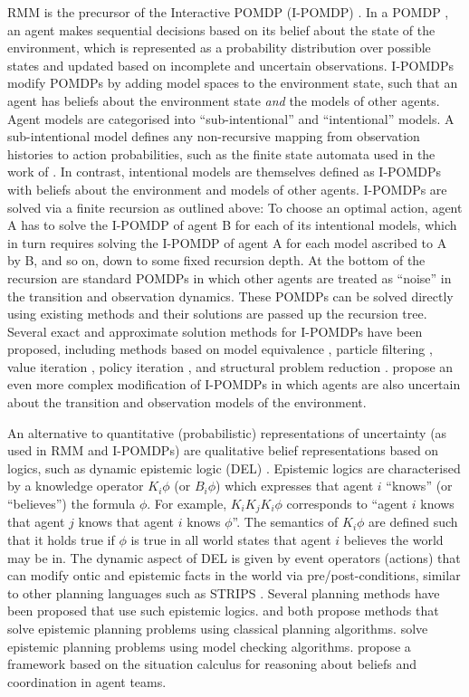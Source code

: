 \documentclass[final,1p,times,authoryear]{elsarticle}
\begin{document}
RMM is the precursor of the Interactive POMDP (I-POMDP) \citep{gd2005}. In a POMDP \citep{s1971}, an agent makes sequential decisions based on its belief about the state of the environment, which is represented as a probability distribution over possible states and updated based on incomplete and uncertain observations. I-POMDPs modify POMDPs by adding model spaces to the environment state, such that an agent has beliefs about the environment state \emph{and} the models of other agents. Agent models are categorised into ``sub-intentional'' and ``intentional'' models. A sub-intentional model defines any non-recursive mapping from observation histories to action probabilities, such as the finite state automata used in the work of \citet{pg2017}. In contrast, intentional models are themselves defined as I-POMDPs with beliefs about the environment and models of other agents. I-POMDPs are solved via a finite recursion as outlined above: To choose an optimal action, agent A has to solve the I-POMDP of agent B for each of its intentional models, which in turn requires solving the I-POMDP of agent A for each model ascribed to A by B, and so on, down to some fixed recursion depth. At the bottom of the recursion are standard POMDPs in which other agents are treated as ``noise'' in the transition and observation dynamics. These POMDPs can be solved directly using existing methods \citep{klc1998} and their solutions are passed up the recursion tree. Several exact and approximate solution methods for I-POMDPs have been proposed, including methods based on model equivalence \citep{rdg2006}, particle filtering \citep{dg2009}, value iteration \citep{dp2008}, policy iteration \citep{sd2015}, and structural problem reduction \citep{hl2013}. \citet{nbmw2012} propose an even more complex modification of I-POMDPs in which agents are also uncertain about the transition and observation models of the environment.

An alternative to quantitative (probabilistic) representations of uncertainty (as used in RMM and I-POMDPs) are qualitative belief representations based on logics, such as dynamic epistemic logic (DEL) \citep{ba2011,lpw2010}. Epistemic logics are characterised by a knowledge operator $K_i \phi$ (or $B_i \phi$) which expresses that agent $i$ ``knows'' (or ``believes'') the formula $\phi$. For example, $K_i K_j K_i \phi$ corresponds to ``agent $i$ knows that agent $j$ knows that agent $i$ knows $\phi$''. The semantics of $K_i \phi$ are defined such that it holds true if $\phi$ is true in all world states that agent $i$ believes the world may be in. The dynamic aspect of DEL is given by event operators (actions) that can modify ontic and epistemic facts in the world via pre/post-conditions, similar to other planning languages such as STRIPS \citep{fn1971}. Several planning methods have been proposed that use such epistemic logics. \citet{mbfm2015} and \citet{kg2015} both propose methods that solve epistemic planning problems using classical planning algorithms. \citet{vdh2002} solve epistemic planning problems using model checking algorithms. \citet{gll2007} propose a framework based on the situation calculus \citep{mh1969} for reasoning about beliefs and coordination in agent teams.
\end{document}
